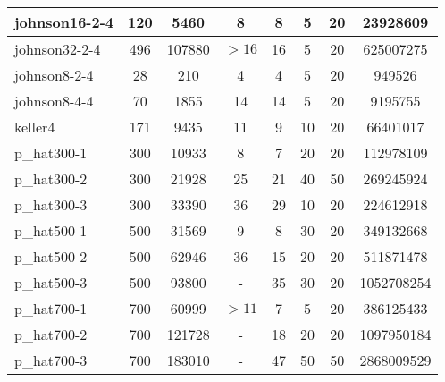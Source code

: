 \begin{tabular}{|l|c|c|c|c|c|c|c|}
\hline
johnson16-2-4 & 120 & 5460 & 8 & 8 & 5 & 20 & 23928609\\ 
\hline
johnson32-2-4 & 496 & 107880 & $>16$ & 16 & 5 & 20 & 625007275\\ 
\hline
johnson8-2-4 & 28 & 210 & 4 & 4 & 5 & 20 & 949526\\ 
\hline
johnson8-4-4 & 70 & 1855 & 14 & 14 & 5 & 20 & 9195755\\ 
\hline
keller4 & 171 & 9435 & 11 & 9 & 10 & 20 & 66401017\\ 
\hline
p\_hat300-1 & 300 & 10933 & 8 & 7 & 20 & 20 & 112978109\\ 
\hline
p\_hat300-2 & 300 & 21928 & 25 & 21 & 40 & 50 & 269245924\\ 
\hline
p\_hat300-3 & 300 & 33390 & 36 & 29 & 10 & 20 & 224612918\\ 
\hline
p\_hat500-1 & 500 & 31569 & 9 & 8 & 30 & 20 & 349132668\\ 
\hline
p\_hat500-2 & 500 & 62946 & 36 & 15 & 20 & 20 & 511871478\\ 
\hline
p\_hat500-3 & 500 & 93800 & - & 35 & 30 & 20 & 1052708254\\ 
\hline
p\_hat700-1 & 700 & 60999 & $>11$ & 7 & 5 & 20 & 386125433\\ 
\hline
p\_hat700-2 & 700 & 121728 & - & 18 & 20 & 20 & 1097950184\\ 
\hline
p\_hat700-3 & 700 & 183010 & - & 47 & 50 & 50 & 2868009529\\ 
\hline
\end{tabular}

